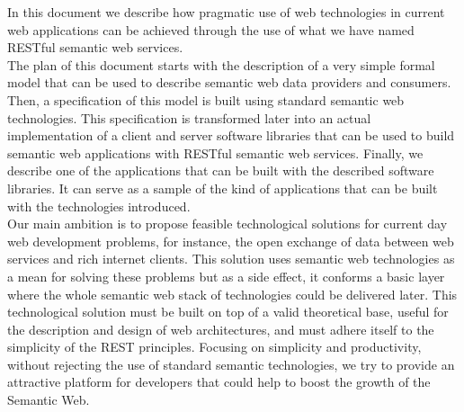 In this document we describe how pragmatic use of web technologies in current web applications can be
achieved through the use of what we have named RESTful semantic web services.\\

The plan of this document starts with the description of a very simple formal model that can be used to describe semantic web data
providers and consumers. Then, a specification of this model is built using standard semantic web technologies. This
specification is transformed later into an actual implementation of a client and server software libraries that can be
used to build semantic web applications with RESTful semantic web services. Finally, we describe one of
the applications that can be built with the described software libraries. It can serve as a sample of the kind of
applications that can be built with the technologies introduced.\\

Our main ambition is to propose feasible technological solutions for current day web development problems, for instance,
the open exchange of data between web services and rich internet clients. This solution uses semantic web technologies as a mean for solving these problems
but as a side effect, it conforms a basic layer where the whole semantic web stack of technologies could be delivered later. This technological
solution must be built on top of a valid theoretical base, useful for the description and design of web architectures, and must
adhere itself to the simplicity of the REST principles. Focusing on simplicity and productivity, without rejecting the use of standard semantic technologies, we try to provide
an attractive platform for developers that could help to boost the growth of the Semantic Web.